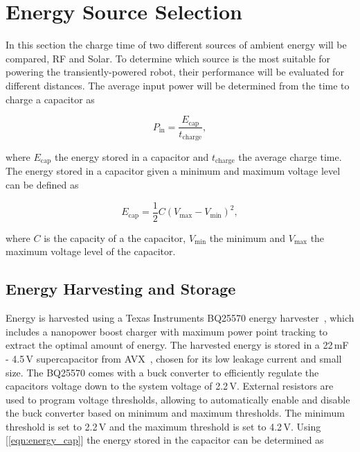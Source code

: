 \section{Energy Source Selection}
\label{sec:pre_energy_source_selection}

In this section the charge time of two different sources of ambient energy will be compared, RF and Solar.
To determine which source is the most suitable for powering the transiently-powered robot, their performance will be evaluated for different distances.
The average input power will be determined from the time to charge a capacitor as

\begin{equation}
	P_{\text{in}} = \frac{E_{\text{cap}}}{t_{\text{charge}}},
\end{equation}

\noindent
where $E_{\text{cap}}$ the energy stored in a capacitor and $t_{\text{charge}}$ the average charge time.
The energy stored in a capacitor given a minimum and maximum voltage level can be defined as

\begin{equation}
\label{eqn:energy_cap}
	E_{\text{cap}} = \frac{1}{2}C(V_{\max} - V_{\min})^{2},
\end{equation}

\noindent
where $C$ is the capacity of a the capacitor, $V_{\min}$ the minimum and $V_{\max}$ the maximum voltage level of the capacitor.

\subsection{Energy Harvesting and Storage}
\label{sec:pre_energy_harvesting_storage}
Energy is harvested using a Texas Instruments BQ25570 energy harvester~\cite{bq25570_2017}, which includes a nanopower boost charger with maximum power point tracking to extract the optimal amount of energy. 
The harvested energy is stored in a 22\,mF - 4.5\,V supercapacitor from AVX~\cite{avx_bestcap_2017}, chosen for its low leakage current and small size.
The BQ25570 comes with a buck converter to efficiently regulate the capacitors voltage down to the system voltage of 2.2\,V.
External resistors are used to program voltage thresholds, allowing to automatically enable and disable the buck converter based on minimum and maximum thresholds.
The minimum threshold is set to 2.2\,V and the maximum threshold is set to 4.2\,V.
Using [\ref{eqn:energy_cap}] the energy stored in the capacitor can be determined as

